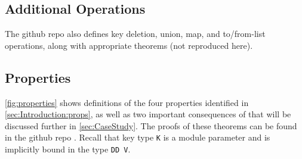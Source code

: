 \subsection{Additional Operations}

The github repo \citep{github:agda} also defines key deletion, union, map, and to/from-list operations, along with appropriate theorems (not reproduced here).

\subsection{Properties}


\autoref{fig:properties} shows definitions of the four properties identified in \autoref{sec:Introduction:props}, as well as two important consequences of \Extensional{} that will be discussed further in \autoref{sec:CaseStudy}.
%
The proofs of these theorems can be found in the github repo \citep{github:agda}.
%
Recall that key type \verb+K+ is a module parameter and is implicitly bound in the type \verb+DD V+.
